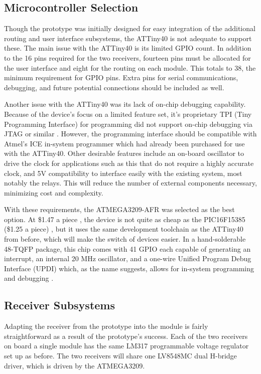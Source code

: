 \documentclass{article}
\begin{document}
	\subsection{Microcontroller Selection}

	Though the prototype was initially designed for easy integration of the additional routing and user interface subsystems, the ATTiny40 is not adequate to support these.  The main issue with the ATTiny40 is its limited GPIO count.  In addition to the 16 pins required for the two receivers, fourteen pins must be allocated for the user interface and eight for the routing on each module.  This totals to 38, the minimum requirement for GPIO pins.  Extra pins for serial communications, debugging, and future potential connections should be included as well. 

	Another issue with the ATTiny40 was its lack of on-chip debugging capability.  Because of the device's focus on a limited feature set, it's proprietary TPI (Tiny Programming Interface) for programming did not support on-chip debugging via JTAG or similar \cite{ATTiny40_datasheet}.  However, the programming interface should be compatible with Atmel's ICE in-system programmer which had already been purchased for use with the ATTiny40.  Other desirable features include an on-board oscillator to drive the clock for applications such as this that do not require a highly accurate clock, and 5V compatibility to interface easily with the existing system, most notably the relays.  This will reduce the number of external components necessary, minimizing cost and complexity.

	With these requirements, the ATMEGA3209-AFR was selected as the best option.  At \$1.47 a piece \cite{ATMEGA3209_digikey}, the device is not quite as cheap as the PIC16F15385 (\$1.25 a piece) \cite{PIC16F_datasheet}, but it uses the same development toolchain as the ATTiny40 from before, which will make the switch of devices easier.  In a hand-solderable 48-TQFP package, this chip comes with 41 GPIO each capable of generating an interrupt, an internal 20 MHz oscillator, and a one-wire Unified Program Debug Interface (UPDI) which, as the name suggests, allows for in-system programming and debugging \cite{ATMEGA3209_datasheet}.

	\subsection{Receiver Subsystems}

	Adapting the receiver from the prototype into the module is fairly straightforward as a result of the prototype's success.  Each of the two receivers on board a single module has the same LM317 programmable voltage regulator set up as before.  The two receivers will share one LV8548MC dual H-bridge driver, which is driven by the ATMEGA3209.
\end{document}
